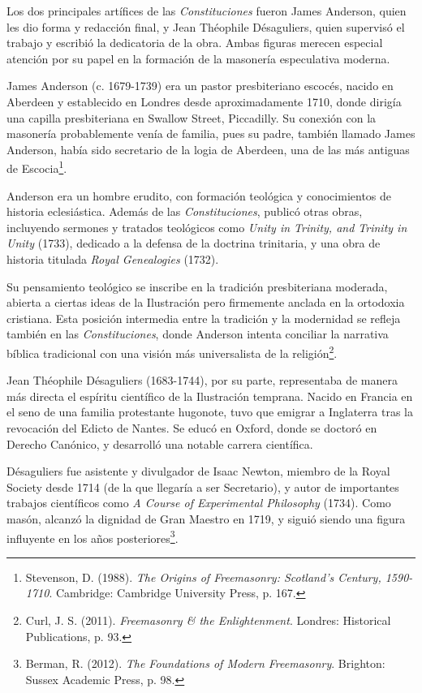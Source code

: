 \documentclass[a4paper,12pt,twoside]{book}
\begin{document}
Los dos principales artífices de las \textit{Constituciones} fueron James Anderson, quien les dio forma y redacción final, y Jean Théophile Désaguliers, quien supervisó el trabajo y escribió la dedicatoria de la obra. Ambas figuras merecen especial atención por su papel en la formación de la masonería especulativa moderna.

James Anderson (c. 1679-1739) era un pastor presbiteriano escocés, nacido en Aberdeen y establecido en Londres desde aproximadamente 1710, donde dirigía una capilla presbiteriana en Swallow Street, Piccadilly. Su conexión con la masonería probablemente venía de familia, pues su padre, también llamado James Anderson, había sido secretario de la logia de Aberdeen, una de las más antiguas de Escocia\footnote{Stevenson, D. (1988). \textit{The Origins of Freemasonry: Scotland's Century, 1590-1710}. Cambridge: Cambridge University Press, p. 167.}.

Anderson era un hombre erudito, con formación teológica y conocimientos de historia eclesiástica. Además de las \textit{Constituciones}, publicó otras obras, incluyendo sermones y tratados teológicos como \textit{Unity in Trinity, and Trinity in Unity} (1733), dedicado a la defensa de la doctrina trinitaria, y una obra de historia titulada \textit{Royal Genealogies} (1732).

Su pensamiento teológico se inscribe en la tradición presbiteriana moderada, abierta a ciertas ideas de la Ilustración pero firmemente anclada en la ortodoxia cristiana. Esta posición intermedia entre la tradición y la modernidad se refleja también en las \textit{Constituciones}, donde Anderson intenta conciliar la narrativa bíblica tradicional con una visión más universalista de la religión\footnote{Curl, J. S. (2011). \textit{Freemasonry & the Enlightenment}. Londres: Historical Publications, p. 93.}.

Jean Théophile Désaguliers (1683-1744), por su parte, representaba de manera más directa el espíritu científico de la Ilustración temprana. Nacido en Francia en el seno de una familia protestante hugonote, tuvo que emigrar a Inglaterra tras la revocación del Edicto de Nantes. Se educó en Oxford, donde se doctoró en Derecho Canónico, y desarrolló una notable carrera científica.

Désaguliers fue asistente y divulgador de Isaac Newton, miembro de la Royal Society desde 1714 (de la que llegaría a ser Secretario), y autor de importantes trabajos científicos como \textit{A Course of Experimental Philosophy} (1734). Como masón, alcanzó la dignidad de Gran Maestro en 1719, y siguió siendo una figura influyente en los años posteriores\footnote{Berman, R. (2012). \textit{The Foundations of Modern Freemasonry}. Brighton: Sussex Academic Press, p. 98.}.
\end{document}
